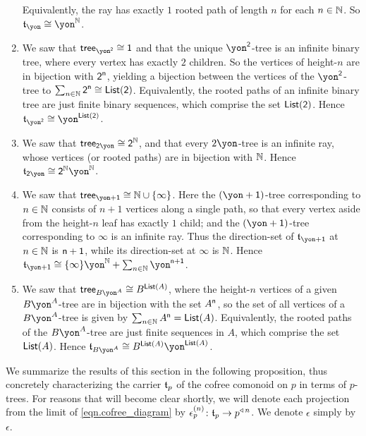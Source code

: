 \documentclass[Book-Poly]{subfiles}
\begin{document}
\begin{exercise}
\begin{solution}
\begin{enumerate}
    Equivalently, the ray has exactly $1$ rooted path of length $n$ for each $n\in\mathbb{N}$.
    So $\car{t}_\yon\iso\yon^\nn$.
    \item We saw that $\tr_{\yon^\2}\iso\1$ and that the unique $\yon^\2$-tree is an infinite binary tree, where every vertex has exactly $2$ children.
    So the vertices of height-$n$ are in bijection with $\textsf{2}^{\mathsf{n}}$, yielding a bijection between the vertices of the $\yon^\2$-tree to $\sum_{n\in\mathbb{N}}\textsf{2}^{\mathsf{n}}\cong\mathsf{List}(\textsf{2})$.
    Equivalently, the rooted paths of an infinite binary tree are just finite binary sequences, which comprise the set $\mathsf{List}(\textsf{2})$.
    Hence $\car{t}_{\yon^\2}\iso\yon^{\lst(\2)}$.
    \item We saw that $\tr_{\2\yon}\iso\2^\nn$, and that every $2\yon$-tree is an infinite ray, whose vertices (or rooted paths) are in bijection with $\mathbb{N}$.
    Hence $\car{t}_{\2\yon}\iso\2^\nn\yon^\nn$.
    \item We saw that $\tr_{\yon+\1}\iso\nn\cup\{\infty\}$.
    Here the $(\yon+\1)$-tree corresponding to $n\in\mathbb{N}$ consists of $n+1$ vertices along a single path, so that every vertex aside from the height-$n$ leaf has exactly $1$ child; and the $(\yon+\1)$-tree corresponding to $\infty$ is an infinite ray.
    Thus the direction-set of $\car{t}_{\yon+\1}$ at $n\in\mathbb{N}$ is $\mathsf{n}+\textsf{1}$, while its direction-set at $\infty$ is $\mathbb{N}$.
    Hence $\car{t}_{\yon+\1}\iso\{\infty\}\yon^\nn+\sum_{n\in\nn}\yon^{\ord{n}+\1}$.
    \item We saw that $\tr_{B\yon^A}\iso B^{\lst(A)}$, where the height-$n$ vertices of a given $B\yon^A$-tree are in bijection with the set $A^{\mathsf{n}}$, so the set of all vertices of a $B\yon^A$-tree is given by $\sum_{n\in\mathbb{N}}A^{\mathsf{n}}=\mathsf{List}(A)$.
    Equivalently, the rooted paths of the $B\yon^A$-tree are just finite sequences in $A$, which comprise the set $\mathsf{List}(A)$.
    Hence $\car{t}_{B\yon^A}\iso B^{\lst(A)}\yon^{\lst(A)}$.
\end{enumerate}
\end{solution}
\end{exercise}

We summarize the results of this section in the following proposition, thus concretely characterizing the carrier $\mathfrak{t}_p$ of the cofree comonoid on $p$ in terms of $p$-trees.
For reasons that will become clear shortly, we will denote each projection from the limit of \eqref{eqn.cofree_diagram} by $\epsilon^{(n)}_p\colon\mathfrak{t}_p\to p^{\mathbin{\triangleleft}\,n}$. We denote $\epsilon$ simply by $\epsilon$.
\end{document}
